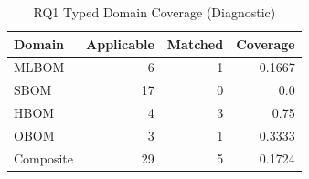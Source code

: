 \begin{table}[htbp]
\caption{RQ1 Typed Domain Coverage (Diagnostic)}
\label{tab:rq1-domain-coverage}
\centering\small
\begin{tabular}{lrrr}
\toprule
\textbf{Domain} & \textbf{Applicable} & \textbf{Matched} & \textbf{Coverage} \\
\midrule
  MLBOM & 6 & 1 & 0.1667 \\
  SBOM & 17 & 0 & 0.0 \\
  HBOM & 4 & 3 & 0.75 \\
  OBOM & 3 & 1 & 0.3333 \\
\midrule
  Composite & 29 & 5 & 0.1724 \\
\bottomrule
\end{tabular}
\end{table}